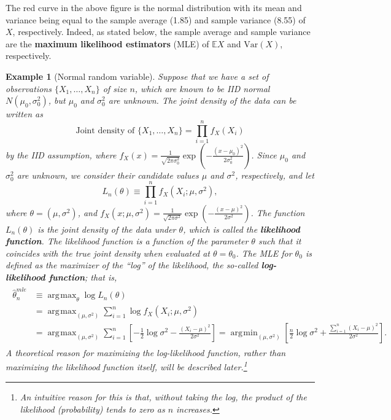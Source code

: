 \documentclass[10.5pt, A4paper, openany, uplatex]{book}
\newcommand{\E}{\mathbb{E}}
\newcommand{\Var}{\mathrm{Var}}
\renewcommand{\hat}{\widehat}
\newtheorem{example}[theorem]{Example}
\numberwithin{equation}{section}
\DeclareMathOperator*{\argmin}{\arg\!\min}
\DeclareMathOperator*{\argmax}{\arg\!\max}
\begin{document}
The red curve in the above figure is the normal distribution with its mean and variance being equal to the sample average (1.85) and sample variance (8.55) of $X$, respectively.
Indeed, as stated below, the sample average and sample variance are the \textbf{maximum likelihood estimators} (MLE) of $\E X$ and $\Var(X)$, respectively.

\begin{example}[Normal random variable]\label{ex:normal}\upshape
Suppose that we have a set of observations $\{X_1, \ldots, X_n\}$ of size $n$, which are known to be IID normal $N(\mu_0, \sigma_0^2)$, but $\mu_0$ and $\sigma_0^2$ are unknown.
The joint density of the data can be written as
\[
	\text{Joint density of $\{X_1, \ldots, X_n\}$} = \prod_{i=1}^n f_X(X_i)
\] 
by the IID assumption, where $f_X(x) = \frac{1}{\sqrt{2 \pi \sigma_0^2}}\exp\left(-\frac{(x - \mu_0)^2}{2 \sigma_0^2}\right)$.
Since $\mu_0$ and $\sigma_0^2$ are unknown, we consider their candidate values $\mu$ and $\sigma^2$, respectively, and let
\[
	L_n(\theta) \equiv \prod_{i=1}^n f_X(X_i; \mu, \sigma^2),
\]
where $\theta = (\mu, \sigma^2)$, and $f_X(x; \mu, \sigma^2) = \frac{1}{\sqrt{2 \pi \sigma^2}}\exp\left(-\frac{(x - \mu)^2}{2 \sigma^2}\right)$.
The function $L_n(\theta)$ is the joint density of the data under $\theta$, which is called the \textbf{likelihood function}.
The likelihood function is a function of the parameter $\theta$ such that it coincides with the true joint density when evaluated at $\theta = \theta_0$.
The MLE for $\theta_0$ is defined as the maximizer of the ``log'' of the likelihood, the so-called \textbf{log-likelihood function}; that is,
\begin{align}\label{eq:mle-normal}
\begin{split}
	\hat{\theta}^{mle}_n 
		& \equiv \argmax_{\theta} \log L_n(\theta) \\
		& = \argmax_{(\mu, \sigma^2)} \sum_{i=1}^n \log f_X(X_i; \mu, \sigma^2)\\
		& = \argmax_{(\mu, \sigma^2)} \sum_{i=1}^n \left[ - \frac{1}{2}\log \sigma^2 - \frac{(X_i - \mu)^2}{2 \sigma^2}\right] = \argmin_{(\mu, \sigma^2)}  \left[ \frac{n}{2}\log \sigma^2 + \frac{\sum_{i=1}^n (X_i - \mu)^2}{2 \sigma^2}\right].
\end{split}
\end{align}
A theoretical reason for maximizing the log-likelihood function, rather than maximizing the likelihood function itself, will be described later.\footnote{
	An intuitive reason for this is that, without taking the log, the product of the likelihood (probability) tends to zero as $n$ increases.
	}


\end{example}
\end{document}
